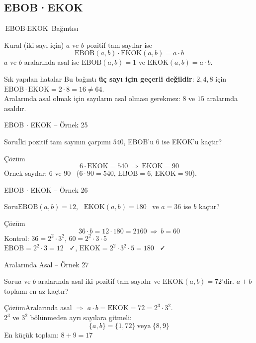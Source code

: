\documentclass[aspectratio=169,11pt]{beamer}
\newcommand{\soru}[3]{%
\begin{frame}{#1}
  \begin{block}{Soru}\large #2\end{block}
  \pause
  \begin{exampleblock}{Çözüm}\large #3\end{exampleblock}
\end{frame}}
\begin{document}
\subsection{EBOB·EKOK}
\begin{frame}{\(\text{EBOB}\cdot\text{EKOK}\) Bağıntısı}
\begin{block}{Kural (iki sayı için)}
\(a\) ve \(b\) pozitif tam sayılar ise
\[\text{EBOB}(a,b)\cdot\text{EKOK}(a,b)=a\cdot b\]
\(a\) ve \(b\) aralarında asal ise \(\text{EBOB}(a,b)=1\) ve \(\text{EKOK}(a,b)=a\cdot b\).
\end{block}
\begin{alertblock}{Sık yapılan hatalar}
Bu bağıntı \textbf{üç sayı için geçerli değildir}: \(2,4,8\) için \(\text{EBOB}\cdot\text{EKOK}=2\cdot 8=16\neq 64\).\\
Aralarında asal olmak için sayıların asal olması gerekmez: \(8\) ve \(15\) aralarında asaldır.
\end{alertblock}
\end{frame}

\soru{EBOB $\cdot$ EKOK -- Örnek 25}
{İki pozitif tam sayının çarpımı \(540\), EBOB'u \(6\) ise EKOK'u kaçtır?}
{\[6\cdot\text{EKOK}=540\ \Rightarrow\ \text{EKOK}=90\]
Örnek sayılar: \(6\) ve \(90\) \ (\(6\cdot 90=540\), \(\text{EBOB}=6\), \(\text{EKOK}=90\)).}

\soru{EBOB $\cdot$ EKOK -- Örnek 26}
{\(\text{EBOB}(a,b)=12\), \ \(\text{EKOK}(a,b)=180\) \ ve \(a=36\) ise \(b\) kaçtır?}
{\[36\cdot b=12\cdot 180=2160\ \Rightarrow\ b=60\]
Kontrol: \(36=2^2\cdot 3^2\), \(60=2^2\cdot 3\cdot 5\)\\[3pt]
\(\text{EBOB}=2^2\cdot 3=12\) \ ✓, \quad \(\text{EKOK}=2^2\cdot 3^2\cdot 5=180\) \ ✓}

\soru{Aralarında Asal -- Örnek 27}
{\(a\) ve \(b\) aralarında asal iki pozitif tam sayıdır ve \(\text{EKOK}(a,b)=72\)'dir. \(a+b\) toplamı en az kaçtır?}
{Aralarında asal \(\Rightarrow\) \(a\cdot b=\text{EKOK}=72=2^3\cdot 3^2\).\\[3pt]
\(2^3\) ve \(3^2\) bölünmeden ayrı sayılara gitmeli:
\[\{a,b\}=\{1,72\}\ \text{veya}\ \{8,9\}\]
En küçük toplam: \(8+9=17\)}
\end{document}
